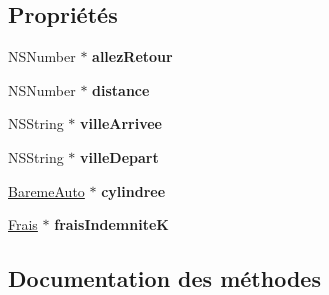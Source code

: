 \subsection*{Propriétés}
\begin{DoxyCompactItemize}
\item 
\hypertarget{interface_indemnite_k_a4770309485fd7794ae9d87a947f0085d}{}N\+S\+Number $\ast$ {\bfseries allez\+Retour}\label{interface_indemnite_k_a4770309485fd7794ae9d87a947f0085d}

\item 
\hypertarget{interface_indemnite_k_a4f296b161923a97e41a7a1e5b7db7068}{}N\+S\+Number $\ast$ {\bfseries distance}\label{interface_indemnite_k_a4f296b161923a97e41a7a1e5b7db7068}

\item 
\hypertarget{interface_indemnite_k_a7f7fc42c91dc942af55bd50315474d29}{}N\+S\+String $\ast$ {\bfseries ville\+Arrivee}\label{interface_indemnite_k_a7f7fc42c91dc942af55bd50315474d29}

\item 
\hypertarget{interface_indemnite_k_a6629ab33a0830d38dcffdb8fe220e6af}{}N\+S\+String $\ast$ {\bfseries ville\+Depart}\label{interface_indemnite_k_a6629ab33a0830d38dcffdb8fe220e6af}

\item 
\hypertarget{interface_indemnite_k_a115fd238f5def7385cac215ceb45876d}{}\hyperlink{interface_bareme_auto}{Bareme\+Auto} $\ast$ {\bfseries cylindree}\label{interface_indemnite_k_a115fd238f5def7385cac215ceb45876d}

\item 
\hypertarget{interface_indemnite_k_a257a67597abbfe68e8d51cfedcae54eb}{}\hyperlink{interface_frais}{Frais} $\ast$ {\bfseries frais\+Indemnite\+K}\label{interface_indemnite_k_a257a67597abbfe68e8d51cfedcae54eb}

\end{DoxyCompactItemize}


\subsection{Documentation des méthodes}
\hypertarget{interface_indemnite_k_a66a362b552379186741e23882dfa8466}{}
